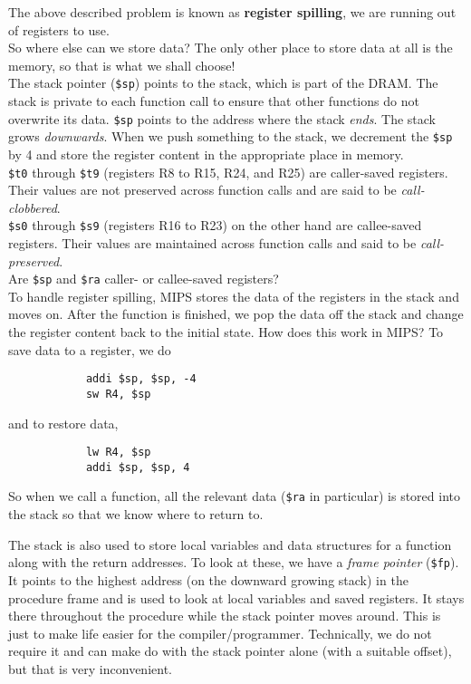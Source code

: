 \documentclass{article}
\begin{document}
		The above described problem is known as \textbf{register spilling}, we are running out of registers to use.\\
		So where else can we store data? The only other place to store data at all is the memory, so that is what we shall choose!\\
		The stack pointer (\texttt{\$sp}) points to the stack, which is part of the DRAM. The stack is private to each function call to ensure that other functions do not overwrite its data. \texttt{\$sp} points to the address where the stack \emph{ends}. The stack grows \emph{downwards}. When we push something to the stack, we decrement the \texttt{\$sp} by 4 and store the register content in the appropriate place in memory.\\

		\texttt{\$t0} through \texttt{\$t9} (registers R8 to R15, R24, and R25) are caller-saved registers. Their values are not preserved across function calls and are said to be \emph{call-clobbered}.\\
		\texttt{\$s0} through \texttt{\$s9} (registers R16 to R23) on the other hand are callee-saved registers. Their values are maintained across function calls and said to be \emph{call-preserved}.\\
		Are \texttt{\$sp} and \texttt{\$ra} caller- or callee-saved registers?\\

		To handle register spilling, MIPS stores the data of the registers in the stack and moves on. After the function is finished, we pop the data off the stack and change the register content back to the initial state. How does this work in MIPS? To save data to a register, we do
		\begin{verbatim}
			addi $sp, $sp, -4
			sw R4, $sp
		\end{verbatim}
		and to restore data,
		\begin{verbatim}
			lw R4, $sp
			addi $sp, $sp, 4
		\end{verbatim}
		So when we call a function, all the relevant data (\texttt{\$ra} in particular) is stored into the stack so that we know where to return to.

		The stack is also used to store local variables and data structures for a function along with the return addresses. To look at these, we have a \emph{frame pointer} (\texttt{\$fp}). It points to the highest address (on the downward growing stack) in the procedure frame and is used to look at local variables and saved registers. It stays there throughout the procedure while the stack pointer moves around. This is just to make life easier for the compiler/programmer. Technically, we do not require it and can make do with the stack pointer alone (with a suitable offset), but that is very inconvenient.
\end{document}
